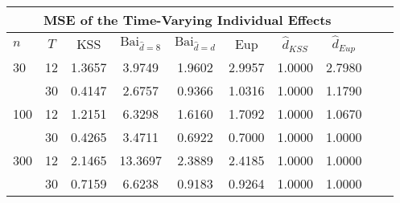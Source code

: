 \begin{tabular}{lccccccccc} 
\hline \multicolumn{8}{c}{MSE of the Time-Varying Individual Effects} \\ \hline 
$n$ & $T$ & KSS & $ \text{Bai}_{\hat{d} = 8}$ & $\text{Bai}_{\hat{d} = d}$ & Eup & $\hat{d}_{KSS}$ & $\hat{d}_{Eup}$ \\
\hline
30 & 12 &  1.3657  &  3.9749  &  1.9602  &  2.9957  &  1.0000  &  2.7980  \\
& 30 &  0.4147  &  2.6757  &  0.9366  &  1.0316  &  1.0000  &  1.1790  \\
100 & 12 &  1.2151  &  6.3298  &  1.6160  &  1.7092  &  1.0000  &  1.0670  \\
& 30 &  0.4265  &  3.4711  &  0.6922  &  0.7000  &  1.0000  &  1.0000  \\
300 & 12 &  2.1465  &  13.3697  &  2.3889  &  2.4185  &  1.0000  &  1.0000  \\
& 30 &  0.7159  &  6.6238  &  0.9183  &  0.9264  &  1.0000  &  1.0000  \\
\end{tabular} 
